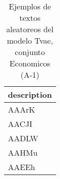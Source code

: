 \begin{table}[H]
\centering
\fontsize{8}{14}\selectfont
\caption{Ejemplos de textos aleatoreos del modelo Tvae, conjunto Economicos (A-1)}
\label{table-sample10-economicos-a-1-tvae-text}
\begin{tabular}{|m{50em}|}
\hline
\rowcolor[gray]{0.8}
description \\
\hline AAArK \\
\hline AACJI \\
\hline AADLW \\
\hline AAHMu \\
\hline AAEEh \\
\hline
\end{tabular}
\end{table}

